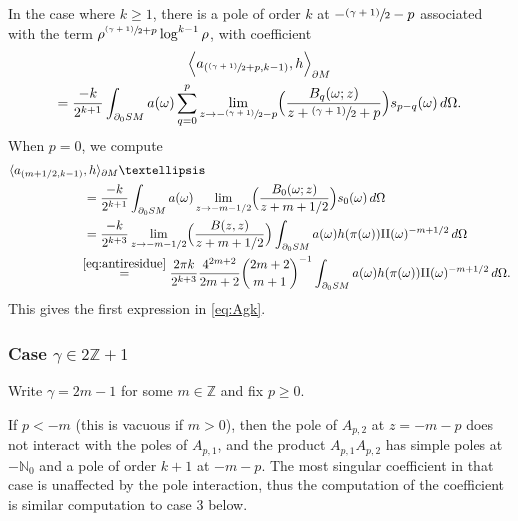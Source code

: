 \documentclass[11pt]{article}
\newcommand{\psfrac}[2]{\sfrac{(#1)}{#2}}
\theoremstyle{plain}
\theoremstyle{definition}
\theoremstyle{remark}
\def\Nm{{\mathbb{N}}}
\def\Zm{{\mathbb{Z}}}
\def\two{\mathrm{II}}
\begin{document}
In the case where $k\ge 1$, there is a pole of order $k$ at $-\sfrac{(\gamma+1)}{2}-p$ associated with the term $\rho^{\psfrac{\gamma+1}{2}+p}\log^{k-1} \rho$, with coefficient
\begin{multline*}
\Bigl\langle a_{(\psfrac{\gamma+1}{2}+p, k-1)}, h\Bigr\rangle_{\partial M}\\
= \frac{-k}{2^{k+1}} \int_{\partial_0 SM} a(\omega)
\sum_{q=0}^p \lim_{z\to -\psfrac{\gamma+1}{2}-p} \Bigl(\frac{B_q(\omega; z)}{z+ \psfrac{\gamma+1}{2}+p}\Bigr) s_{p-q}(\omega)\,d\Omega.
\end{multline*}
When $p=0$, we compute
\begin{align*}
\langle a_{(m+1/2, k-1)}&, h\rangle_{\partial M} \ldots \\
&= \frac{-k}{2^{k+1}} \int_{\partial_0 SM} a(\omega) \lim_{z\to -m-1/2} \Bigl(\frac{B_0(\omega; z)}{z+ m+ 1/2}\Bigr) s_{0}(\omega)\,d\Omega \\
&= \frac{-k}{2^{k+3}} \lim_{z\to -m-1/2} \Bigl(\frac{B(z,z)}{z+ m+ 1/2}\Bigr) \int_{\partial_0 SM} a(\omega) h(\pi(\omega)) \two(\omega)^{-m+1/2} \,d\Omega \\
&\!\!\stackrel{\eqref{eq:antiresidue}}{=} \frac{2\pi k}{2^{k+3}} \frac{4^{2m+2}}{2m+2} \binom{2m+2}{m+1}^{-1} \int_{\partial_0 SM} a(\omega) h(\pi(\omega)) \two(\omega)^{-m+1/2} \,d\Omega.
\end{align*}
This gives the first expression in \eqref{eq:Agk}.

\subsubsection*{Case $\gamma\in 2\Zm + 1$}
Write $\gamma = 2m-1$ for some $m\in \Zm$ and fix $p\ge 0$.

If $p<-m$ (this is vacuous if $m>0$), then the pole of $A_{p,2}$ at $z = -m-p$ does not interact with the poles of $A_{p,1}$, and the product $A_{p,1} A_{p,2}$ has simple poles at $-\Nm_0$ and a pole of order $k+1$ at $-m-p$. The most singular coefficient in that case is unaffected by the pole interaction, thus the computation of the coefficient is similar computation to case 3 below.
\end{document}
